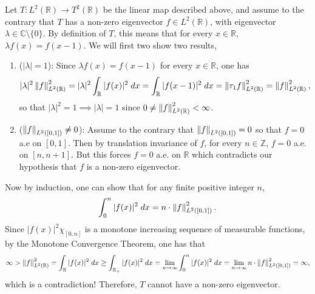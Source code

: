 \documentclass{article}
\begin{document}
	Let $T: L^2(\mathbb{R}) \to T^2(\mathbb{R})$ be the linear map described above, and assume to the contrary that $T$ has a non-zero eigenvector $f \in L^2(\mathbb{R})$, with eigenvector $\lambda \in \mathbb{C} \setminus \{0\}$. By definition of $T$, this means that for every $x \in \mathbb{R}$, $\lambda f(x) = f(x - 1)$. We will first two show two results, 
	\begin{enumerate}[itemsep =-2pt,label = (\arabic{*})]
		\item ($|\lambda| = 1$): Since $\lambda f(x) = f(x - 1)$ for every $x\in \mathbb{R}$, one has 
		\begin{equation*}
			|\lambda|^2\left\Vert f \right\Vert_{L^2(\mathbb{R})}^2 = |\lambda|^2\int_{\mathbb{R}}|f(x)|^2\;dx = \int_{\mathbb{R}}|f(x-1)|^2\;dx  = \left\Vert \tau_{1}f \right\Vert_{L^2(\mathbb{R})}^2 = \left\Vert f \right\Vert_{L^2(\mathbb{R})}^2, 
		\end{equation*}
		so that $|\lambda|^2 = 1 \implies |\lambda| = 1$ since $0 \neq \left\Vert f \right\Vert^2_{L^2(\mathbb{R})} < \infty$. 
		\item ($\left\Vert f \right\Vert_{L^{2}([0,1])} \neq 0$): Assume to the contrary that $\left\Vert f \right\Vert_{L^2([0,1])} = 0$ so that $f = 0$ a.e on $[0,1]$. Then by translation invariance of $f$, for every $n \in \mathbb{Z}$, $f = 0$ a.e. on $[n, n + 1]$. But this forces $f = 0$ a.e. on $\mathbb{R}$ which contradicts our hypothesis that $f$ is a non-zero eigenvector. 
	\end{enumerate}
	Now by induction, one can show that for any finite positive integer $n$, 
	\begin{equation*}
		\int_{0}^{n}|f(x)|^2\;dx = n \cdot \left\Vert f \right\Vert_{L^{2}([0,1])}^2. 
	\end{equation*}
	Since $|f(x)|^2\chi_{[0,n]}$ is a monotone increasing sequence of measurable functions, by the Monotone Convergence Theorem, one has that 
	\begin{equation*}
		\infty > \left\Vert f \right\Vert_{L^{2}(\mathbb{R})}^2 = \int_{\mathbb{R}}|f(x)|^2\;dx \geq \int_{\mathbb{R}_{+}}|f(x)|^2\;dx = \lim_{n \to \infty}\int_{0}^{n}|f(x)|^2\;dx = \lim_{n \to \infty}n \cdot \left\Vert f \right\Vert_{L^2([0,1])}^2 = \infty, 
	\end{equation*}
	which is a contradiction! Therefore, $T$ cannot have a non-zero eigenvector. 
	
\end{document}
